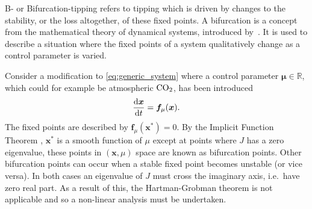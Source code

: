 B- or Bifurcation-tipping refers to tipping which is driven by changes to the stability, or the loss altogether, of these fixed points.
A bifurcation is a concept from the mathematical theory of dynamical systems, introduced by~\cite{Poincare1885}.
It is used to describe a situation where the fixed points of a system qualitatively change as a control parameter is varied.

Consider a modification to \cref{eq:generic_system} where a control parameter $\bm{\mu} \in \mathbb{R}$, which could for example be atmospheric $\ce{CO2}$, has been introduced
\begin{equation}
  \label{eq:generic_system_control_parameter}
  \dv{\bm{x}}{t} = \bm{f}_{\mu}(\bm{x}).
\end{equation}
The fixed points are described by $\bm{f}_{\mu}(\bm{x}^*) = 0$. By the Implicit Function Theorem \parencite{Spivak1965}, $\bm{x}^*$ is a smooth
function of $\mu$ except at points where $J$ has a zero eigenvalue, these points in $(\bm{x},\mu)$ space are known as bifurcation points.
Other bifurcation points can occur when a stable fixed point becomes unstable (or vice versa). In both cases an eigenvalue of $J$ must cross the imaginary
axis, i.e.\ have zero real part\parencite{guckenheimer2013}. As a result of this, the Hartman-Grobman theorem is not applicable and so a non-linear analysis must be undertaken.

